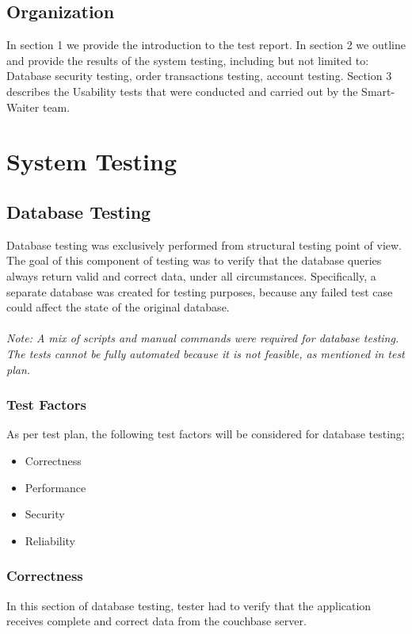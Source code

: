 \documentclass[12pt, titlepage]{article}
\begin{document}
\subsection{Organization}
In section 1 we provide the introduction to the test report. In section 2 we outline and provide the results of the system testing, including but not limited to: Database security testing, order transactions testing, account testing. Section 3 describes the Usability tests that were conducted and carried out by the Smart-Waiter team.
 
\section{System Testing} 
\subsection{Database Testing}
Database testing was exclusively performed from structural testing point of view. The goal of this component of testing was to verify that the database queries always return valid and correct data, under all circumstances. Specifically, a separate database was created for testing purposes, because any failed test case could affect the state of the original database.\\\\
\emph{Note: A mix of scripts and manual commands were required for database testing. The tests cannot be fully automated because it is not feasible, as mentioned in test plan.}
\subsubsection{Test Factors}
As per test plan, the following test factors will be considered for database testing;
\begin{itemize}
 \item Correctness
 \item Performance
 \item Security
 \item Reliability
 \end{itemize}

\subsubsection{Correctness}
In this section of database testing, tester had to verify that the application receives complete and correct data from the couchbase server.
\end{document}
